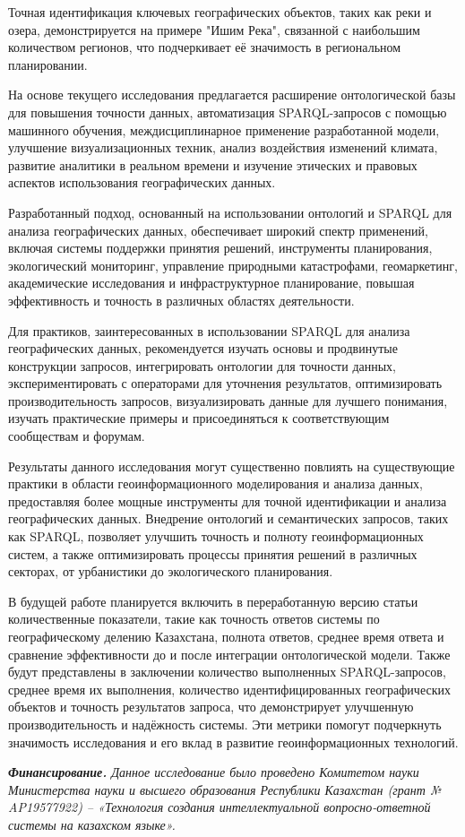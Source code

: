 \begin{multicols}{2}
Точная идентификация ключевых географических объектов, таких как реки и
озера, демонстрируется на примере "Ишим Река", связанной с наибольшим
количеством регионов, что подчеркивает её значимость в региональном
планировании.

На основе текущего исследования предлагается расширение онтологической
базы для повышения точности данных, автоматизация SPARQL-запросов с
помощью машинного обучения, междисциплинарное применение разработанной
модели, улучшение визуализационных техник, анализ воздействия изменений
климата, развитие аналитики в реальном времени и изучение этических и
правовых аспектов использования географических данных.

Разработанный подход, основанный на использовании онтологий и SPARQL для
анализа географических данных, обеспечивает широкий спектр применений,
включая системы поддержки принятия решений, инструменты планирования,
экологический мониторинг, управление природными катастрофами,
геомаркетинг, академические исследования и инфраструктурное
планирование, повышая эффективность и точность в различных областях
деятельности.

Для практиков, заинтересованных в использовании SPARQL для анализа
географических данных, рекомендуется изучать основы и продвинутые
конструкции запросов, интегрировать онтологии для точности данных,
экспериментировать с операторами для уточнения результатов,
оптимизировать производительность запросов, визуализировать данные для
лучшего понимания, изучать практические примеры и присоединяться к
соответствующим сообществам и форумам.

Результаты данного исследования могут существенно повлиять на
существующие практики в области геоинформационного моделирования и
анализа данных, предоставляя более мощные инструменты для точной
идентификации и анализа географических данных. Внедрение онтологий и
семантических запросов, таких как SPARQL, позволяет улучшить точность и
полноту геоинформационных систем, а также оптимизировать процессы
принятия решений в различных секторах, от урбанистики до экологического
планирования.

В будущей работе планируется включить в переработанную версию статьи
количественные показатели, такие как точность ответов системы по
географическому делению Казахстана, полнота ответов, среднее время
ответа и сравнение эффективности до и после интеграции онтологической
модели. Также будут представлены в заключении количество выполненных
SPARQL-запросов, среднее время их выполнения, количество
идентифицированных географических объектов и точность результатов
запроса, что демонстрирует улучшенную производительность и надёжность
системы. Эти метрики помогут подчеркнуть значимость исследования и его
вклад в развитие геоинформационных технологий.

\emph{{\bfseries Финансирование.} Данное исследование было проведено
Комитетом науки Министерства науки и высшего образования Республики
Казахстан (грант № AP19577922) -- «Технология создания интеллектуальной
вопросно-ответной системы на казахском языке».}
\end{multicols}


